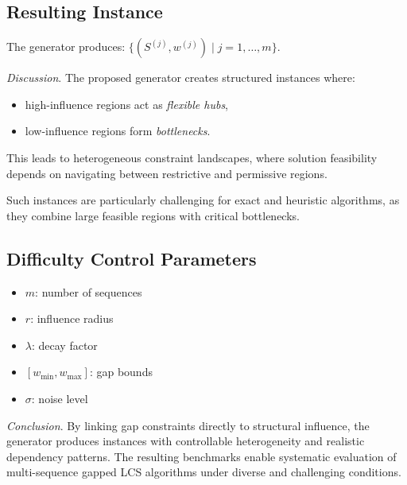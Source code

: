 \documentclass[11pt,a4paper]{article}
\begin{document}
 \subsection{Resulting Instance}
 
 The generator produces:
 $
 \{(S^{(j)}, w^{(j)}) \mid j = 1,\dots,m\}.
 $
 
 
 
 \textit{Discussion}. The proposed generator creates structured instances where:
 \begin{itemize}
 	\item high-influence regions act as \emph{flexible hubs},
 	\item low-influence regions form \emph{bottlenecks}.
 \end{itemize}
 
 This leads to heterogeneous constraint landscapes, where solution feasibility depends on navigating between restrictive and permissive regions.
 
 Such instances are particularly challenging for exact and heuristic algorithms, as they combine large feasible regions with critical bottlenecks.
 
 \subsection{Difficulty Control Parameters}
 
 \begin{itemize}
 	\item $m$: number of sequences
 	\item $r$: influence radius
 	\item $\lambda$: decay factor
 	\item $[w_{\min}, w_{\max}]$: gap bounds
 	\item $\sigma$: noise level
 \end{itemize}
 
 \textit{Conclusion}.  By linking gap constraints directly to structural influence, the generator produces instances with controllable heterogeneity and realistic dependency patterns. The resulting benchmarks enable systematic evaluation of multi-sequence gapped LCS algorithms under diverse and challenging conditions.
 
\end{document}
